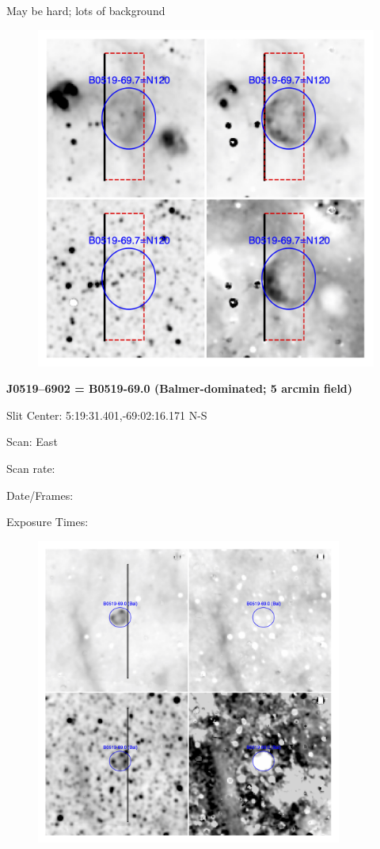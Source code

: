 \documentclass[11pt]{article}
\begin{document}
May be hard; lots of background
\begin{figure}
\includegraphics[width=12.5cm]{snapshots/N120_5arcmin.png}
\end{figure}

\newpage
{\bf J0519--6902 = B0519-69.0 (Balmer-dominated; 5 arcmin field)}  
 
Slit Center:   5:19:31.401,-69:02:16.171 N-S

Scan:  East

Scan rate:  

Date/Frames:

Exposure Times:  

\begin{figure}
\includegraphics[width=10.05cm]{snapshots/B0519-690_5arcmin.png}
\end{figure}
\end{document}
